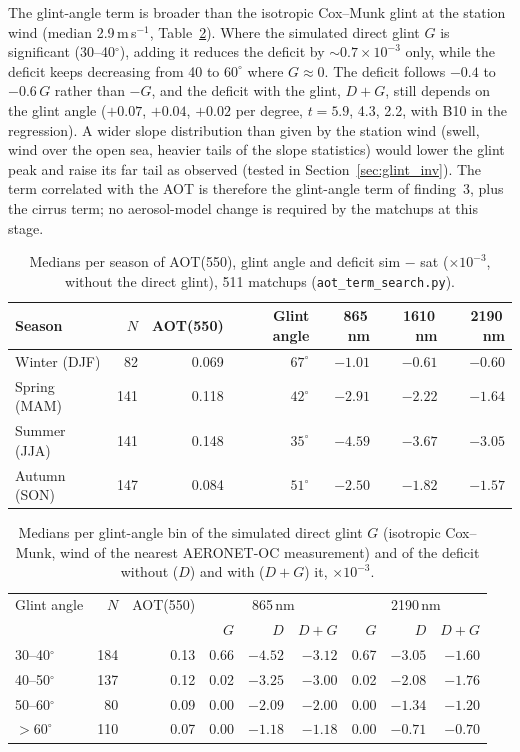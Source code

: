 \documentclass[11pt,a4paper]{article}
\newcommand{\code}[1]{\texttt{#1}}
\begin{document}
The glint-angle term is broader than the isotropic Cox--Munk glint at the station wind (median
2.9\,m\,s$^{-1}$, Table~\ref{tab:aot_glint}). Where the simulated direct glint $G$ is significant
(30--40$^\circ$), adding it reduces the deficit by $\sim0.7\times10^{-3}$ only, while the deficit keeps decreasing
from 40 to $60^\circ$ where $G\approx0$. The deficit follows $-0.4$ to $-0.6\,G$ rather than $-G$, and the
deficit with the glint, $D+G$, still depends on the glint angle ($+0.07$, $+0.04$, $+0.02$ per degree, $t = 5.9$,
4.3, 2.2, with B10 in the regression). A wider slope distribution than given by the station wind (swell, wind
over the open sea, heavier tails of the slope statistics) would lower the glint peak and raise its far tail as
observed (tested in Section~\ref{sec:glint_inv}). The term correlated with the AOT is therefore the glint-angle
term of finding~3, plus the cirrus term; no aerosol-model change is required by the matchups at this stage.

\begin{table}[h]
\centering\small
\caption{Medians per season of AOT(550), glint angle and deficit sim $-$ sat ($\times10^{-3}$, without the direct
glint), 511 matchups (\code{aot\_term\_search.py}).}
\label{tab:aot_season}
\begin{tabular}{lrrrrrr}
\toprule
Season & $N$ & AOT(550) & Glint angle & 865\,nm & 1610\,nm & 2190\,nm \\
\midrule
Winter (DJF) & 82  & 0.069 & $67^\circ$ & $-1.01$ & $-0.61$ & $-0.60$ \\
Spring (MAM) & 141 & 0.118 & $42^\circ$ & $-2.91$ & $-2.22$ & $-1.64$ \\
Summer (JJA) & 141 & 0.148 & $35^\circ$ & $-4.59$ & $-3.67$ & $-3.05$ \\
Autumn (SON) & 147 & 0.084 & $51^\circ$ & $-2.50$ & $-1.82$ & $-1.57$ \\
\bottomrule
\end{tabular}
\end{table}

\begin{table}[h]
\centering\small
\caption{Medians per glint-angle bin of the simulated direct glint $G$ (isotropic Cox--Munk, wind of the
nearest AERONET-OC measurement) and of the deficit without ($D$) and with ($D+G$) it, $\times10^{-3}$.}
\label{tab:aot_glint}
\begin{tabular}{lrrrrrrrr}
\toprule
Glint angle & $N$ & AOT(550) & \multicolumn{3}{c}{865\,nm} & \multicolumn{3}{c}{2190\,nm} \\
 & & & $G$ & $D$ & $D+G$ & $G$ & $D$ & $D+G$ \\
\midrule
30--40$^\circ$ & 184 & 0.13 & 0.66 & $-4.52$ & $-3.12$ & 0.67 & $-3.05$ & $-1.60$ \\
40--50$^\circ$ & 137 & 0.12 & 0.02 & $-3.25$ & $-3.00$ & 0.02 & $-2.08$ & $-1.76$ \\
50--60$^\circ$ & 80  & 0.09 & 0.00 & $-2.09$ & $-2.00$ & 0.00 & $-1.34$ & $-1.20$ \\
$>60^\circ$    & 110 & 0.07 & 0.00 & $-1.18$ & $-1.18$ & 0.00 & $-0.71$ & $-0.70$ \\
\bottomrule
\end{tabular}
\end{table}
\end{document}
